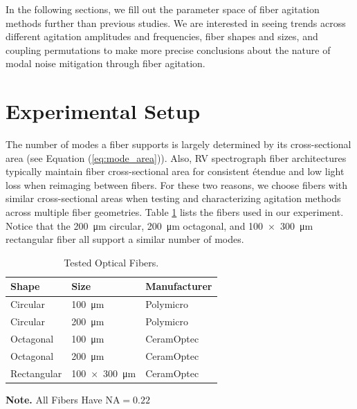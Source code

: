 In the following sections, we fill out the parameter space of fiber agitation methods further than previous studies. We are interested in seeing trends across different agitation amplitudes and frequencies, fiber shapes and sizes, and coupling permutations to make more precise conclusions about the nature of modal noise mitigation through fiber agitation.

\section{Experimental Setup}
\label{modal-noise:exp-setup}

The number of modes a fiber supports is largely determined by its cross-sectional area (see Equation (\ref{eq:mode_area})). Also, RV spectrograph fiber architectures typically maintain fiber cross-sectional area for consistent \'etendue and low light loss when reimaging between fibers. For these two reasons, we choose fibers with similar cross-sectional areas when testing and characterizing agitation methods across multiple fiber geometries. Table \ref{table:fibers} lists the fibers used in our experiment. Notice that the \SI{200}{\micro\meter} circular, \SI{200}{\micro\meter} octagonal, and \SI{100x300}{\micro\meter} rectangular fiber all support a similar number of modes.

\begin{table}
\centering
\begin{threeparttable}
\caption[Optical fibers used for modal noise testing]{Tested Optical Fibers.}
	\begin{tabular}{lll}
	\hline
	Shape & Size & Manufacturer \\
	\hline\hline
	Circular & \SI{100}{\micro\meter} & Polymicro \\
	Circular & \SI{200}{\micro\meter} & Polymicro \\
	Octagonal & \SI{100}{\micro\meter} & CeramOptec \\
	Octagonal & \SI{200}{\micro\meter} & CeramOptec \\
	Rectangular & \SI{100x300}{\micro\meter} & CeramOptec \\
	\hline
	\end{tabular}
	\begin{tablenotes}
	\item \textbf{Note.} All Fibers Have $\mathrm{NA} = 0.22$
	\end{tablenotes}
\end{threeparttable}
\label{table:fibers}
\end{table}

